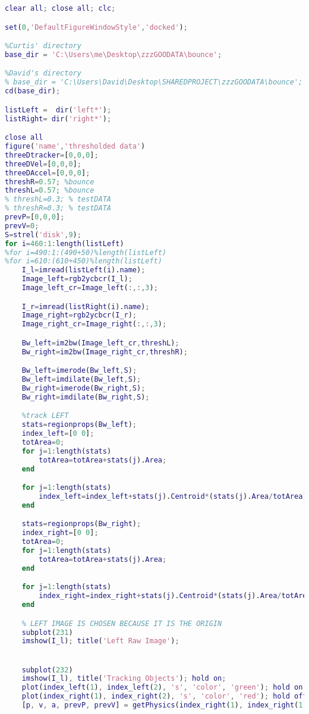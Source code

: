 \documentclass{IEEEtran}
\begin{document}
\begin{lstlisting}[caption={MATLAB Ball Bounce Tracking Demo},label={lst:bounceDemo},language=MATLAB]
clear all; close all; clc;

set(0,'DefaultFigureWindowStyle','docked');

%Curtis' directory
base_dir = 'C:\Users\me\Desktop\zzzGOODATA\bounce';

%David's directory
% base_dir = 'C:\Users\David\Desktop\SHAREDPROJECT\zzzGOODATA\bounce';
cd(base_dir);

listLeft =  dir('left*');
listRight= dir('right*');

close all
figure('name','thresholded data')
threeDtracker=[0,0,0];
threeDVel=[0,0,0];
threeDAccel=[0,0,0];
threshR=0.57; %bounce
threshL=0.57; %bounce
% threshL=0.3; % testDATA
% threshR=0.3; % testDATA
prevP=[0,0,0];
prevV=0;
S=strel('disk',9);
for i=460:1:length(listLeft)
%for i=490:1:(490+50)%length(listLeft)
%for i=610:(610+450)%length(listLeft)
    I_l=imread(listLeft(i).name);
    Image_left=rgb2ycbcr(I_l);
    Image_left_cr=Image_left(:,:,3);

    I_r=imread(listRight(i).name);
    Image_right=rgb2ycbcr(I_r);
    Image_right_cr=Image_right(:,:,3);

    Bw_left=im2bw(Image_left_cr,threshL);
    Bw_right=im2bw(Image_right_cr,threshR);

    Bw_left=imerode(Bw_left,S);
    Bw_left=imdilate(Bw_left,S);
    Bw_right=imerode(Bw_right,S);
    Bw_right=imdilate(Bw_right,S);

    %track LEFT
    stats=regionprops(Bw_left);
    index_left=[0 0];
    totArea=0;
    for j=1:length(stats)
        totArea=totArea+stats(j).Area;
    end

    for j=1:length(stats)
        index_left=index_left+stats(j).Centroid*(stats(j).Area/totArea);
    end

    stats=regionprops(Bw_right);
    index_right=[0 0];
    totArea=0;
    for j=1:length(stats)
        totArea=totArea+stats(j).Area;
    end

    for j=1:length(stats)
        index_right=index_right+stats(j).Centroid*(stats(j).Area/totArea);
    end

    % LEFT IMAGE IS CHOSEN BECAUSE IT IS THE ORIGIN
    subplot(231)
    imshow(I_l); title('Left Raw Image');


    subplot(232)
    imshow(I_l), title('Tracking Objects'); hold on;
    plot(index_left(1), index_left(2), 's', 'color', 'green'); hold on;
    plot(index_right(1), index_right(2), 's', 'color', 'red'); hold off;
    [p, v, a, prevP, prevV] = getPhysics(index_right(1), index_right(1),index_left(1),index_left(2),prevP,prevV);


\end{lstlisting}
\end{document}
